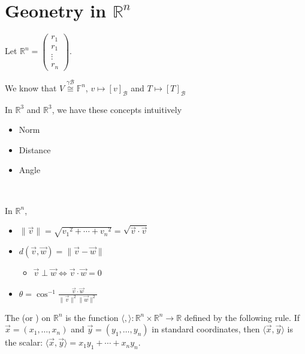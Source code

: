 \documentclass[11pt,fleqn]{book} %
\begin{document}
\section{Geonetry in $\mathbb{R}^n$}

Let $\mathbb{R}^n = \begin{pmatrix} r_1 \\ r_1 \\ \vdots \\ r_n \end{pmatrix}$. 

\noindent We know that $V \overset{\gamma\mathcal{B}}{\cong} \mathbb{F}^n$, $v \mapsto [v]_\mathcal{B}$ and $T \mapsto [T]_\mathcal{B}$

\noindent In $\mathbb{R}^3$ and $\mathbb{R}^3$, we have these concepts intuitively
\begin{itemize}
    \item Norm
    \item Distance
    \item Angle
\end{itemize}

{~~~}

\noindent In $\mathbb{R}^n$, 
\begin{itemize}
    \item $\|\vec{v}\| = \sqrt{{v_1}^2 + \cdots + {v_n}^2} = \sqrt{\vec{v} \cdot \vec{v}}$
    \item $d(\vec{v}, \vec{w}) = \|\vec{v} - \vec{w}\|$
    \begin{itemize}
        \item $\vec{v} \perp \vec{w} \iff \vec{v} \cdot \vec{w} = 0$
    \end{itemize}
    \item $\theta = \cos^{-1}\frac{\vec{v} \cdot \vec{w}}{\|\vec{v}\|^2 \|\vec{w}\|^2}$
\end{itemize}

\setcounter{chapter}{4}\label{Def4_3_1}
\begin{definition}
    The  (or ) on $\mathbb{R}^n$ is the function $\langle , \rangle : \mathbb{R}^n \times \mathbb{R}^n \to \mathbb{R}$ defined by the following rule. If $\vec{x} = (x_1, \dots, x_n)$ and $\vec{y} =  (y_1, \dots, y_n)$ in standard coordinates, then $\langle \vec{x}, \vec{y} \rangle$ is the scalar: $\langle \vec{x}, \vec{y} \rangle = x_1y_1 + \cdots + x_ny_n$. 
\end{definition}
\setcounter{chapter}{3}
\end{document}
